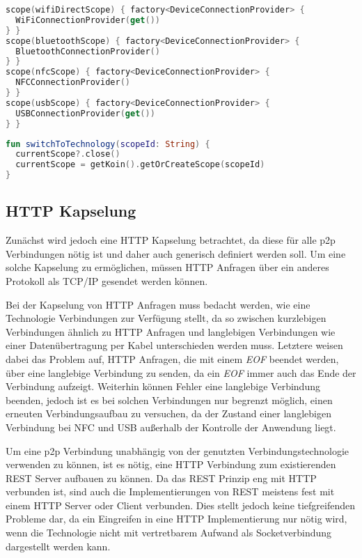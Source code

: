         \begin{lstlisting}[frame=bt, label={lst:android:koin}, language=Kotlin, caption=Auswechselbarkeit durch Dependency Injection (Clientcode in Kotlin)]
scope(wifiDirectScope) { factory<DeviceConnectionProvider> {
  WiFiConnectionProvider(get())
} }
scope(bluetoothScope) { factory<DeviceConnectionProvider> {
  BluetoothConnectionProvider()
} }
scope(nfcScope) { factory<DeviceConnectionProvider> {
  NFCConnectionProvider()
} }
scope(usbScope) { factory<DeviceConnectionProvider> {
  USBConnectionProvider(get())
} }  
        \end{lstlisting}
        
        \begin{lstlisting}[frame=bt, label={lst:android:scope}, language=Kotlin, caption=Auswechselbarkeit durch Dependency Injection (Clientcode in Kotlin)]
fun switchToTechnology(scopeId: String) {
  currentScope?.close()
  currentScope = getKoin().getOrCreateScope(scopeId)
}
        \end{lstlisting}
        
    \subsection{HTTP Kapselung}
        Zunächst wird jedoch eine HTTP Kapselung betrachtet, da diese für alle p2p Verbindungen nötig ist und daher auch generisch definiert werden soll. Um eine solche Kapselung zu ermöglichen, müssen HTTP Anfragen über ein anderes Protokoll als TCP/IP gesendet werden können.
        
        Bei der Kapselung von HTTP Anfragen muss bedacht werden, wie eine Technologie Verbindungen zur Verfügung stellt, da so zwischen kurzlebigen Verbindungen ähnlich zu HTTP Anfragen und langlebigen Verbindungen wie einer Datenübertragung per Kabel unterschieden werden muss. Letztere weisen dabei das Problem auf, HTTP Anfragen, die mit einem {\it EOF} beendet werden, über eine langlebige Verbindung zu senden, da ein {\it EOF} immer auch das Ende der Verbindung aufzeigt. Weiterhin können Fehler eine langlebige Verbindung beenden, jedoch ist es bei solchen Verbindungen nur begrenzt möglich, einen erneuten Verbindungsaufbau zu versuchen, da der Zustand einer langlebigen Verbindung bei NFC und USB außerhalb der Kontrolle der Anwendung liegt.
    
        Um eine p2p Verbindung unabhängig von der genutzten Verbindungstechnologie verwenden zu können, ist es nötig, eine HTTP Verbindung zum existierenden REST Server aufbauen zu können. Da das REST Prinzip eng mit HTTP verbunden ist, sind auch die Implementierungen von REST meistens fest mit einem HTTP Server oder Client verbunden. Dies stellt jedoch keine tiefgreifenden Probleme dar, da ein Eingreifen in eine HTTP Implementierung nur nötig wird, wenn die Technologie nicht mit vertretbarem Aufwand als Socketverbindung dargestellt werden kann.
        

